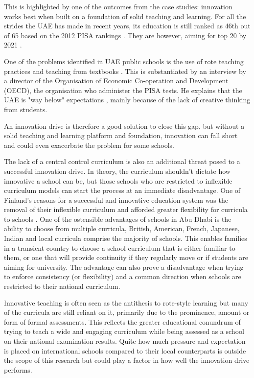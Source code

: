 \documentclass[11pt]{article}
\begin{document}
This is highlighted by one of the outcomes from the case studies: innovation works best when built on a foundation of solid teaching and learning. For all the strides the UAE has made in recent years, its education is still ranked as 46th out of 65 based on the 2012 PISA rankings \citep{2013}. They are however, aiming for top 20 by 2021 \citep{UAEGovernment2012}.

One of the problems identified in UAE public schools is the use of rote teaching practices and teaching from textbooks \cite[p. 88]{hatherley2012cultural} . This is substantiated by an interview by a director of the Organisation of Economic Co-operation and Development (OECD), the organisation who administer the PISA tests. He explains that the UAE is "way below" expectations \citep{Navdar2016}, mainly because of the lack of creative thinking from students. 

An innovation drive is therefore a good solution to close this gap, but without a solid teaching and learning platform and foundation, innovation can fall short and could even exacerbate the problem for some schools.

The lack of a central control curriculum is also an additional threat posed to a successful innovation drive. In theory, the curriculum shouldn't dictate how innovative a school can be, but those schools who are restricted to inflexible curriculum models can start the process at an immediate disadvantage. One of Finland's reasons for a successful and innovative education system was the removal of their inflexible curriculum and afforded greater flexibility for curricula to schools \citep{Simola2005}. One of the ostensible advantages of schools in Abu Dhabi is the ability to choose from multiple curricula, British, American, French, Japanese, Indian and local curricula comprise the majority of schools. This enables families in a transient country to choose a school curriculum that is either familiar to them, or one that will provide continuity if they regularly move or if students are aiming for university. The advantage can also prove a disadvantage when trying to enforce consistency (or flexibility) and a common direction when schools are restricted to their national curriculum.

Innovative teaching is often seen as the antithesis to rote-style learning but many of the curricula are still reliant on it, primarily due to the prominence, amount or form of formal assessments. This reflects the greater educational conundrum of trying to teach a wide and engaging curriculum while being assessed as a school on their national examination results. Quite how much pressure and expectation is placed on international schools compared to their local counterparts is outside the scope of this research but could play a factor in how well the innovation drive performs.
\end{document}
